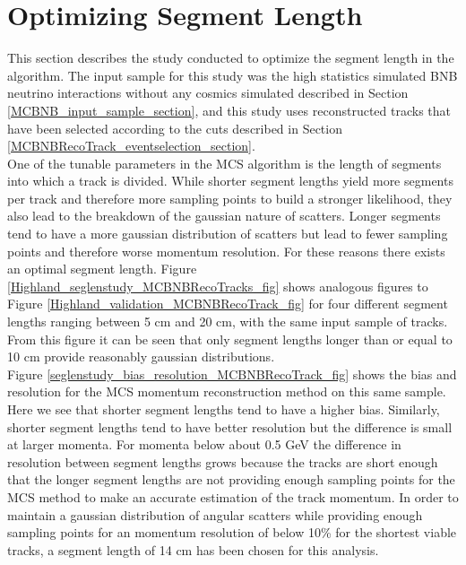 \clearpage
\section{Optimizing Segment Length}\label{SegmentLength_MCBNBRecoTrack_section}
This section describes the study conducted to optimize the segment length in the algorithm. The input sample for this study was the high statistics simulated BNB neutrino interactions without any cosmics simulated described in Section \ref{MCBNB_input_sample_section}, and this study uses reconstructed tracks that have been selected according to the cuts described in Section \ref{MCBNBRecoTrack_eventselection_section}.\\

One of the tunable parameters in the MCS algorithm is the length of segments into which a track is divided. While shorter segment lengths yield more segments per track and therefore more sampling points to build a stronger likelihood, they also lead to the breakdown of the gaussian nature of scatters. Longer segments tend to have a more gaussian distribution of scatters but lead to fewer sampling points and therefore worse momentum resolution. For these reasons there exists an optimal segment length. Figure \ref{Highland_seglenstudy_MCBNBRecoTracks_fig} shows analogous figures to Figure \ref{Highland_validation_MCBNBRecoTrack_fig} for four different segment lengths ranging between 5 cm and 20 cm, with the same input sample of tracks. From this figure it can be seen that only segment lengths longer than or equal to 10 cm provide reasonably gaussian distributions.\\
Figure \ref{seglenstudy_bias_resolution_MCBNBRecoTrack_fig} shows the bias and resolution for the MCS momentum reconstruction method on this same sample. Here we see that shorter segment lengths tend to have a higher bias. Similarly, shorter segment lengths tend to have better resolution but the difference is small at larger momenta. For momenta below about 0.5 GeV the difference in resolution between segment lengths grows because the tracks are short enough that the longer segment lengths are not providing enough sampling points for the MCS method to make an accurate estimation of the track momentum. In order to maintain a gaussian distribution of angular scatters while providing enough sampling points for an momentum resolution of below 10\% for the shortest viable tracks, a segment length of 14 cm has been chosen for this analysis.

